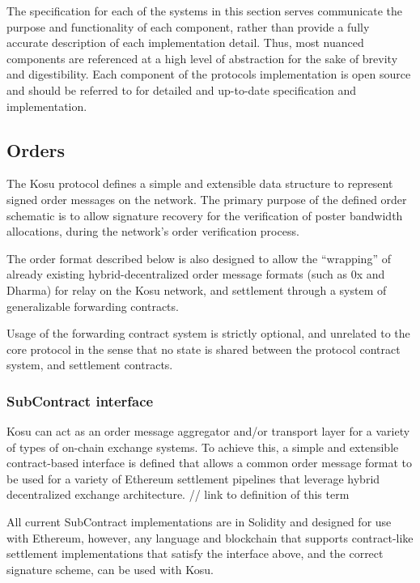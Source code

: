 \documentclass[10pt]{article}
\begin{document}
The specification for each of the systems in this section serves communicate the purpose and functionality of each component, rather than provide a fully accurate description of each implementation detail. Thus, most nuanced components are referenced at a high level of abstraction for the sake of brevity and digestibility. Each component of the protocols implementation is open source\cite{paradigm-github} and should be referred to for detailed and up-to-date specification and implementation. 

\subsection{Orders}\label{orders}

The Kosu protocol defines a simple and extensible data structure to represent signed order messages on the network. The primary purpose of the defined order schematic is to allow signature recovery for the verification of poster bandwidth allocations, during the network’s order verification process.
\medskip

The order format described below is also designed to allow the “wrapping” of already existing hybrid-decentralized order message formats (such as 0x and Dharma) for relay on the Kosu network, and settlement through a system of generalizable forwarding contracts. 
\medskip 

Usage of the forwarding contract system is strictly optional, and unrelated to the core protocol in the sense that no state is shared between the protocol contract system, and settlement contracts.

\subsubsection{SubContract interface}\label{subcontract-interface}

Kosu can act as an order message aggregator and/or transport layer for a variety of types of on-chain exchange systems. To achieve this, a simple and extensible contract-based interface is defined that allows a common order message format to be used for a variety of Ethereum settlement pipelines that leverage hybrid decentralized exchange architecture. // link to definition of this term
\medskip

All current SubContract implementations are in Solidity and designed for use with Ethereum, however, any language and blockchain that supports contract-like settlement implementations that satisfy the interface above, and the correct signature scheme, can be used with Kosu.
\medskip
\end{document}
